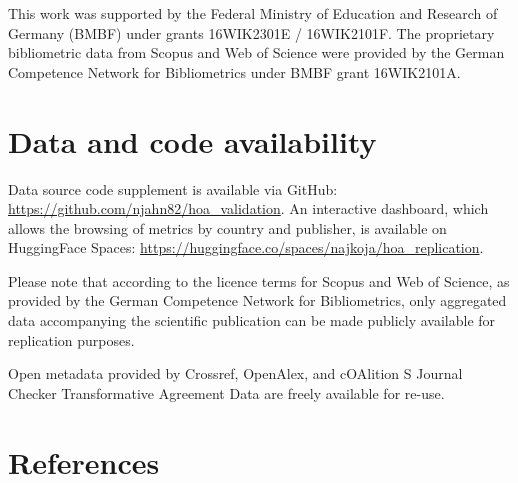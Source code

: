\documentclass[a4paper,man,floatsintext,longtable,noextraspace,10pt]{apa6}
\begin{document}
This work was supported by the Federal Ministry of Education and
Research of Germany (BMBF) under grants 16WIK2301E / 16WIK2101F. The
proprietary bibliometric data from Scopus and Web of Science were
provided by the German Competence Network for Bibliometrics under BMBF
grant 16WIK2101A.

\section*{Data and code availability}\label{data-and-code-availability}

Data source code supplement is available via GitHub:
\url{https://github.com/njahn82/hoa_validation}. An interactive
dashboard, which allows the browsing of metrics by country and
publisher, is available on HuggingFace Spaces:
\url{https://huggingface.co/spaces/najkoja/hoa_replication}.

Please note that according to the licence terms for Scopus and Web of
Science, as provided by the German Competence Network for Bibliometrics,
only aggregated data accompanying the scientific publication can be made
publicly available for replication purposes.

Open metadata provided by Crossref, OpenAlex, and cOAlition S Journal
Checker Transformative Agreement Data are freely available for re-use.

\section*{References}\label{references}
\end{document}
